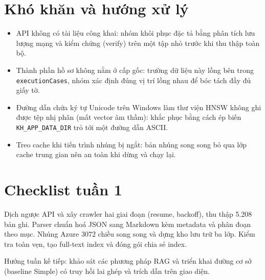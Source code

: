 \documentclass[11pt]{article}
\begin{document}
\section{Khó khăn và hướng xử lý}
\begin{itemize}
  \item API không có tài liệu công khai: nhóm khôi phục đặc tả bằng phân tích lưu lượng mạng
        và kiểm chứng (verify) trên một tập nhỏ trước khi thu thập toàn bộ.
  \item Thành phần hồ sơ không nằm ở cấp gốc: trường dữ liệu này lồng bên trong
        \texttt{executionCases}, nhóm xác định đúng vị trí lồng nhau để bóc tách đầy đủ giấy tờ.
  \item Đường dẫn chứa ký tự Unicode trên Windows làm thư viện HNSW không ghi được tệp nhị
        phân (mất vector âm thầm): khắc phục bằng cách ép biến \texttt{KH\_APP\_DATA\_DIR} trỏ
        tới một đường dẫn ASCII.
  \item Treo cache khi tiến trình nhúng bị ngắt: bản nhúng song song bỏ qua lớp cache trung
        gian nên an toàn khi dừng và chạy lại.
\end{itemize}

\section{Checklist tuần 1}
\begin{itemize}[label={}]
  \cbDone Dịch ngược API và xây crawler hai giai đoạn (resume, backoff), thu thập 5.208 bản ghi.
  \cbDone Parser chuẩn hoá JSON sang Markdown kèm metadata và phân đoạn theo mục.
  \cbDone Nhúng Azure 3072 chiều song song và dựng kho lưu trữ ba lớp.
  \cbDone Kiểm tra toàn vẹn, tạo full-text index và đóng gói chia sẻ index.
\end{itemize}

\noindent Hướng tuần kế tiếp: khảo sát các phương pháp RAG và triển khai đường cơ sở (baseline
Simple) có truy hồi lai ghép và trích dẫn trên giao diện.
\end{document}
